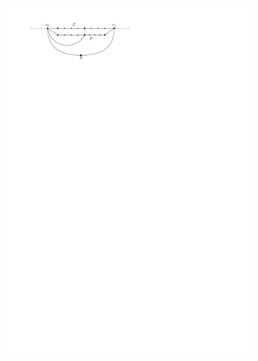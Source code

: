 \documentclass[a4paper]{article}
\begin{document}
\includegraphics[scale=1]{./unifiedAlgo/img/sweep/noChordOnExtriorVertex.pdf}
\clearpage%
\end{document}
